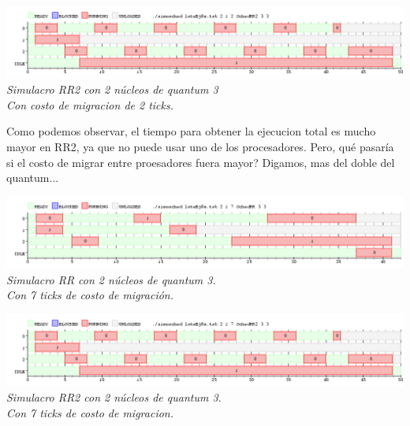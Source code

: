\vspace{\baselineskip}
\begin{center}
\includegraphics[scale=0.45]{../tp1/Test/resEj8Co2SBRR2.png}
\\
\vspace{1pt}
\footnotesize\textit{Simulacro RR2 con 2 n\'ucleos de quantum 3\\Con costo de migracion de 2 ticks.}
\end{center}
\vspace{\baselineskip}

Como podemos observar, el tiempo para obtener la ejecucion total es mucho mayor en RR2, ya que no puede usar uno de los procesadores. 
\textquestiondown Pero, \textquestiondown qu\'e pasar\'ia si el costo de migrar entre proesadores fuera mayor? Digamos, mas del doble del quantum...

\vspace{\baselineskip}
\begin{center}
\includegraphics[scale=0.45]{../tp1/Test/resEj8Co2SBRRMM.png}
\\
\vspace{1pt}
\footnotesize\textit{Simulacro RR con 2 n\'ucleos de quantum 3.\\Con 7 ticks de costo de migraci\'on.}
\end{center}
\vspace{\baselineskip}

\vspace{\baselineskip}
\begin{center}
\includegraphics[scale=0.45]{../tp1/Test/resEj8Co2SBRR2MM.png}
\\
\vspace{1pt}
\footnotesize\textit{Simulacro RR2 con 2 n\'ucleos de quantum 3.\\Con 7 ticks de costo de migracion.}
\end{center}
\vspace{\baselineskip}

